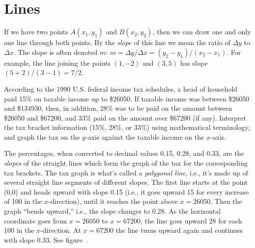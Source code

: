 \section{Lines}{}{}

If we have two points $A(x_1,y_1)$ and $B(x_2,y_2)$, then we can draw one
and only one line through both points.  By the {\it slope} of this line
we mean the ratio of $\Delta y$ to $\Delta x$.  The slope is often denoted
$m$: $m=\Delta y/\Delta x=(y_2-y_1)/(x_2-x_1)$.  For example, the line
joining the points $(1,-2)$ and $(3,5)$ has slope
$(5+2)/(3-1)=7/2$.



\begin{example} According to the 1990 U.S. federal income tax schedules, a head
of household paid 15\% on taxable income up to \$26050. If taxable
income was between \$26050 and \$134930, then, in addition, 28\% was to
be paid on the amount between \$26050 and \$67200, and 33\% paid on
the amount over \$67200 (if any).  Interpret the tax bracket
information (15\%, 28\%, or 33\%) using mathematical terminology, and
graph the tax on the $y$-axis against the taxable income on the
$x$-axis.

The percentages, when converted to decimal values 0.15, 0.28, and 0.33,
are the {\it slopes} of the straight lines which form the graph of the
tax for
the corresponding tax brackets.  The tax graph is what's called a
{\it polygonal line}, i.e., it's made up of several straight line segments
of different slopes.  The first line starts at the point (0,0) and heads
upward with slope 0.15 (i.e., it goes upward 15 for every increase of
100 in the $x$-direction), until it reaches the point above $x=26050$.
Then the graph ``bends upward,'' i.e., the slope changes to 0.28.  As
the horizontal coordinate goes from $x=26050$ to $x=67200$, the line
goes upward 28 for each 100 in the $x$-direction.  At $x=67200$ the
line turns upward again and continues with slope 0.33.  See
figure~.
\end{example}

%

